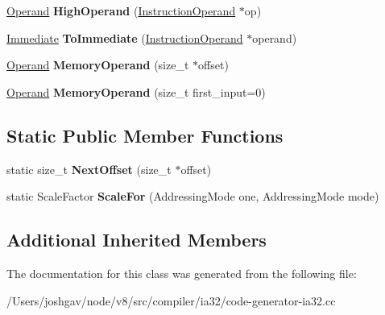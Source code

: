 \begin{DoxyCompactItemize}
\item 
\hyperlink{classv8_1_1internal_1_1_operand}{Operand} {\bfseries High\+Operand} (\hyperlink{classv8_1_1internal_1_1compiler_1_1_instruction_operand}{Instruction\+Operand} $\ast$op)\hypertarget{classv8_1_1internal_1_1compiler_1_1_i_a32_operand_converter_a8bb425cd431c5fef75b68ad06554f359}{}\label{classv8_1_1internal_1_1compiler_1_1_i_a32_operand_converter_a8bb425cd431c5fef75b68ad06554f359}

\item 
\hyperlink{classv8_1_1internal_1_1_immediate}{Immediate} {\bfseries To\+Immediate} (\hyperlink{classv8_1_1internal_1_1compiler_1_1_instruction_operand}{Instruction\+Operand} $\ast$operand)\hypertarget{classv8_1_1internal_1_1compiler_1_1_i_a32_operand_converter_a729775ae73e32869ff6d70238e1ec625}{}\label{classv8_1_1internal_1_1compiler_1_1_i_a32_operand_converter_a729775ae73e32869ff6d70238e1ec625}

\item 
\hyperlink{classv8_1_1internal_1_1_operand}{Operand} {\bfseries Memory\+Operand} (size\+\_\+t $\ast$offset)\hypertarget{classv8_1_1internal_1_1compiler_1_1_i_a32_operand_converter_a43f13ba18c892c9dd82236ee7933c99b}{}\label{classv8_1_1internal_1_1compiler_1_1_i_a32_operand_converter_a43f13ba18c892c9dd82236ee7933c99b}

\item 
\hyperlink{classv8_1_1internal_1_1_operand}{Operand} {\bfseries Memory\+Operand} (size\+\_\+t first\+\_\+input=0)\hypertarget{classv8_1_1internal_1_1compiler_1_1_i_a32_operand_converter_aa718a8b823b4e61a37c18ddb718f7e73}{}\label{classv8_1_1internal_1_1compiler_1_1_i_a32_operand_converter_aa718a8b823b4e61a37c18ddb718f7e73}

\end{DoxyCompactItemize}
\subsection*{Static Public Member Functions}
\begin{DoxyCompactItemize}
\item 
static size\+\_\+t {\bfseries Next\+Offset} (size\+\_\+t $\ast$offset)\hypertarget{classv8_1_1internal_1_1compiler_1_1_i_a32_operand_converter_a4a3e27e14acefc12bdcf1671afcc5756}{}\label{classv8_1_1internal_1_1compiler_1_1_i_a32_operand_converter_a4a3e27e14acefc12bdcf1671afcc5756}

\item 
static Scale\+Factor {\bfseries Scale\+For} (Addressing\+Mode one, Addressing\+Mode mode)\hypertarget{classv8_1_1internal_1_1compiler_1_1_i_a32_operand_converter_a4ab3618ff495426c0745d64429e21f16}{}\label{classv8_1_1internal_1_1compiler_1_1_i_a32_operand_converter_a4ab3618ff495426c0745d64429e21f16}

\end{DoxyCompactItemize}
\subsection*{Additional Inherited Members}


The documentation for this class was generated from the following file\+:\begin{DoxyCompactItemize}
\item 
/\+Users/joshgav/node/v8/src/compiler/ia32/code-\/generator-\/ia32.\+cc\end{DoxyCompactItemize}
